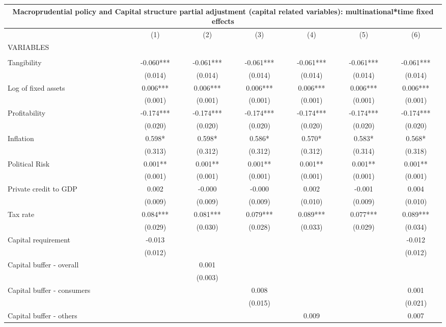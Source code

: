 \begin{tabular}{lcccccc}
\multicolumn{7}{c}{Macroprudential policy and Capital structure partial adjustment (capital related variables): multinational*time fixed effects} \\ \hline
 & (1) & (2) & (3) & (4) & (5) & (6) \\
VARIABLES &  &  &  &  &  &  \\ \hline
 &  &  &  &  &  &  \\
Tangibility & -0.060*** & -0.061*** & -0.061*** & -0.061*** & -0.061*** & -0.061*** \\
 & (0.014) & (0.014) & (0.014) & (0.014) & (0.014) & (0.014) \\
Log of fixed assets & 0.006*** & 0.006*** & 0.006*** & 0.006*** & 0.006*** & 0.006*** \\
 & (0.001) & (0.001) & (0.001) & (0.001) & (0.001) & (0.001) \\
Profitability & -0.174*** & -0.174*** & -0.174*** & -0.174*** & -0.174*** & -0.174*** \\
 & (0.020) & (0.020) & (0.020) & (0.020) & (0.020) & (0.020) \\
Inflation & 0.598* & 0.598* & 0.586* & 0.570* & 0.583* & 0.568* \\
 & (0.313) & (0.312) & (0.312) & (0.312) & (0.314) & (0.318) \\
Political Risk & 0.001** & 0.001** & 0.001** & 0.001** & 0.001** & 0.001** \\
 & (0.001) & (0.001) & (0.001) & (0.001) & (0.001) & (0.001) \\
Private credit to GDP & 0.002 & -0.000 & -0.000 & 0.002 & -0.001 & 0.004 \\
 & (0.009) & (0.009) & (0.009) & (0.010) & (0.009) & (0.010) \\
Tax rate & 0.084*** & 0.081*** & 0.079*** & 0.089*** & 0.077*** & 0.089*** \\
 & (0.029) & (0.030) & (0.028) & (0.033) & (0.029) & (0.034) \\
Capital requirement & -0.013 &  &  &  &  & -0.012 \\
 & (0.012) &  &  &  &  & (0.012) \\
Capital buffer - overall &  & 0.001 &  &  &  &  \\
 &  & (0.003) &  &  &  &  \\
Capital buffer - consumers &  &  & 0.008 &  &  & 0.001 \\
 &  &  & (0.015) &  &  & (0.021) \\
Capital buffer - others &  &  &  & 0.009 &  & 0.007 \\

\end{tabular}
